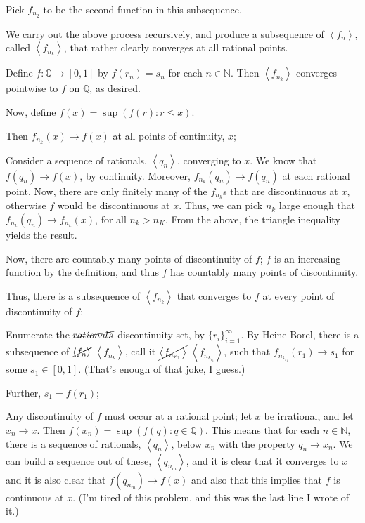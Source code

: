 \documentclass[a4paper,12pt]{article}
\newcommand{\tab}{\hspace{4mm}} %
\newcommand{\anbrack}[1]{\left\langle #1 \right\rangle}
\newcommand{\N}{\mathbb{N}}
\newcommand{\Q}{\mathbb{Q}}
\begin{document}
\tab Pick $f_{n_2}$ to be the second function in this subsequence.

\tab We carry out the above process recursively, and produce a subsequence of $\anbrack{f_n}$, called $\anbrack{f_{n_k}}$, that rather clearly converges at all rational points. 

\tab Define $f: \Q \to [0,1]$ by $f(r_n) = s_n$ for each $n \in \N$. Then $\anbrack{f_{n_k}}$ converges pointwise to $f$ on $\Q$, as desired.

Now, define $f(x) = \sup(f(r): r \leq x)$.

Then $f_{n_k}(x) \to f(x)$ at all points of continuity, $x$;

\tab Consider a sequence of rationals, $\anbrack{q_n}$, converging to $x$. We know that $f(q_n) \to f(x)$, by continuity. Moreover, $f_{n_k}(q_n) \to f(q_n)$ at each rational point. Now, there are only finitely many of the $f_{n_k}$s that are discontinuous at $x$, otherwise $f$ would be discontinuous at $x$. Thus, we can pick $n_k$ large enough that $f_{n_k}(q_n) \to f_{n_k}(x)$, for all $n_k > n_K$. From the above, the triangle inequality yields the result.

Now, there are countably many points of discontinuity of $f$; $f$ is an increasing function by the definition, and thus $f$ has countably many points of discontinuity.

Thus, there is a subsequence of $\anbrack{f_{n_k}}$ that converges to $f$ at every point of discontinuity of $f$;

\tab Enumerate the $\cancel{rationals}$ discontinuity set, by $\{r_i\}_{i=1}^\infty$. By Heine-Borel, there is a subsequence of $\cancel{\anbrack{f_n}}$ $\anbrack{f_{n_k}}$, call it $\cancel{\anbrack{f_{n_{r_1}}}}$ $\anbrack{f_{n_{k_{r_1}}}}$, such that $f_{n_{k_{r_1}}}(r_1) \to s_1$ for some $s_1 \in [0,1]$. (That's enough of that joke, I guess.)

\tab Further, $s_1 = f(r_1)$;

\tab \tab Any discontinuity of $f$ must occur at a rational point; let $x$ be irrational, and let $x_n \to x$. Then $f(x_n) = \sup(f(q): q \in \Q)$. This means that for each $n \in \N$, there is a sequence of rationals, $\anbrack{q_n}$, below $x_n$ with the property $q_n \to x_n$. We can build a sequence out of these, $\anbrack{q_{n_m}}$, and it is clear that it converges to $x$ and it is also clear that $f(q_{n_m}) \to f(x)$ and also that this implies that $f$ is continuous at $x$. (I'm tired of this problem, and this was the last line I wrote of it.)
\end{document}
